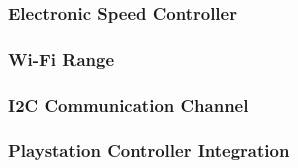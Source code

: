   \subsubsection{Electronic Speed Controller}
  
  \subsubsection{Wi-Fi Range}
  
  \subsubsection{I2C Communication Channel}
  
  \subsubsection{Playstation Controller Integration}
